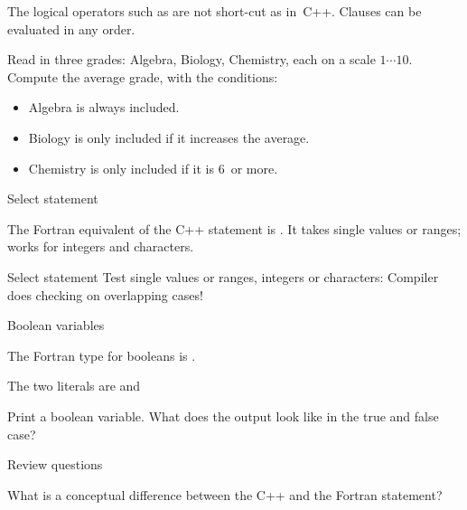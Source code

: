 The logical operators such as  are not short-cut as
in~C++. Clauses can be evaluated in any order.

\begin{exercise}
  \label{ex:fgrades}
  Read in three grades: Algebra, Biology, Chemistry, each on a scale
  $1\cdots 10$. Compute the average grade, with the conditions:
  \begin{itemize}
  \item Algebra is always included.
  \item Biology is only included if it increases the average.
  \item Chemistry is only included if it is 6~or more.
  \end{itemize}
\end{exercise}

 {Select statement}

The Fortran equivalent of the C++  statement is . It takes
single values or ranges; works for integers and characters.

\begin{block}{Select statement}
  \label{sl:fswitch}
  Test single values or ranges, integers or characters:
  Compiler does checking on overlapping cases!
\end{block}

 {Boolean variables}

The Fortran type for booleans is .

The two literals are  and 

\begin{exercise}
  \label{ex:fprintbool}
  Print a boolean variable. What does the output look like in the true
  and false case?
\end{exercise}

 {Review questions}

\begin{exercise}
  \label{ex:select-vs-switch}
  What is a conceptual difference between the C++  and the
  Fortran  statement?
\end{exercise}
